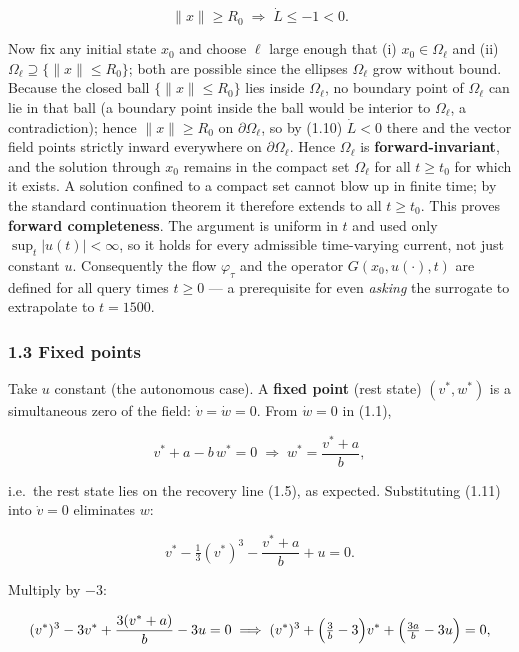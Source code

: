 \documentclass[
  11pt,
]{article}
\providecommand{\lt}{<}
\begin{document}
\[
\|x\|\ge R_0 \;\Longrightarrow\; \dot L\le -1\lt 0.
\tag{1.10}
\]

Now fix any initial state \(x_0\) and choose \(\ell\) large enough that
(i) \(x_0\in\Omega_\ell\) and (ii)
\(\Omega_\ell\supseteq\{\|x\|\le R_0\}\); both are possible since the
ellipses \(\Omega_\ell\) grow without bound. Because the closed ball
\(\{\|x\|\le R_0\}\) lies inside \(\Omega_\ell\), no boundary point of
\(\Omega_\ell\) can lie in that ball (a boundary point inside the ball
would be interior to \(\Omega_\ell\), a contradiction); hence
\(\|x\|\ge R_0\) on \(\partial\Omega_\ell\), so by (1.10)
\(\dot L\lt 0\) there and the vector field points strictly inward
everywhere on \(\partial\Omega_\ell\). Hence \(\Omega_\ell\) is
\textbf{forward-invariant}, and the solution through \(x_0\) remains in
the compact set \(\Omega_\ell\) for all \(t\ge t_0\) for which it
exists. A solution confined to a compact set cannot blow up in finite
time; by the standard continuation theorem it therefore extends to all
\(t\ge t_0\). This proves \textbf{forward completeness}. The argument is
uniform in \(t\) and used only \(\sup_t|u(t)|\lt \infty\), so it holds
for every admissible time-varying current, not just constant \(u\).
Consequently the flow \(\varphi_\tau\) and the operator
\(G(x_0,u(\cdot),t)\) are defined for all query times \(t\ge 0\) --- a
prerequisite for even \emph{asking} the surrogate to extrapolate to
\(t=1500\).

\subsubsection{1.3 Fixed points}\label{fixed-points}

Take \(u\) constant (the autonomous case). A \textbf{fixed point} (rest
state) \((v^\ast,w^\ast)\) is a simultaneous zero of the field:
\(\dot v=\dot w=0\). From \(\dot w=0\) in (1.1),

\[
v^\ast+a-b\,w^\ast=0\;\Longrightarrow\; w^\ast=\frac{v^\ast+a}{b},
\tag{1.11}
\]

i.e.~the rest state lies on the recovery line (1.5), as expected.
Substituting (1.11) into \(\dot v=0\) eliminates \(w\):

\[
v^\ast-\tfrac13 (v^\ast)^3-\frac{v^\ast+a}{b}+u=0 .
\tag{1.12}
\]

Multiply by \(-3\):

\[
(v^\ast)^3-3v^\ast+\frac{3(v^\ast+a)}{b}-3u=0
\;\Longrightarrow\;
(v^\ast)^3+\Bigl(\tfrac{3}{b}-3\Bigr)v^\ast+\Bigl(\tfrac{3a}{b}-3u\Bigr)=0 ,
\]
\end{document}
